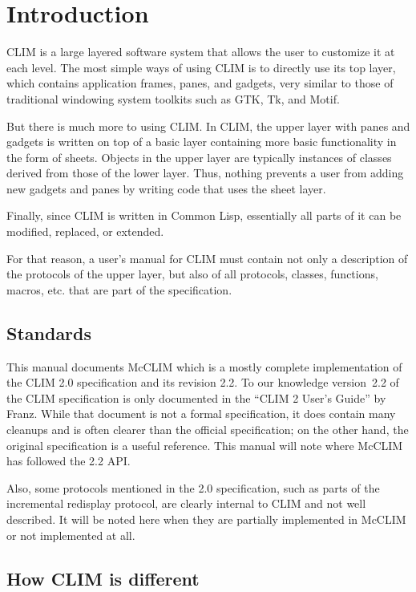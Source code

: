 \chapter{Introduction}
%

CLIM is a large layered software system that allows the user to
customize it at each level.  The most simple ways of using CLIM is to
directly use its top layer, which contains application frames, panes,
and gadgets, very similar to those of traditional windowing system
toolkits such as GTK, Tk, and Motif.

But there is much more to using CLIM.  In CLIM, the upper layer with
panes and gadgets is written on top of a basic layer containing more
basic functionality in the form of sheets.  Objects in the upper layer
are typically instances of classes derived from those of the lower
layer.  Thus, nothing prevents a user from adding new gadgets and panes
by writing code that uses the sheet layer.

Finally, since CLIM is written in Common Lisp, essentially all parts of
it can be modified, replaced, or extended.

For that reason, a user's manual for CLIM must contain not only a
description of the protocols of the upper layer, but also of all
protocols, classes, functions, macros, etc. that are part of the
specification.

\section{Standards}

This manual documents McCLIM which is a mostly
complete implementation of the CLIM 2.0 specification and its revision
2.2. To our knowledge version~2.2 of the CLIM specification is only
documented in the ``CLIM 2 User's Guide'' by Franz. While that document
is not a formal specification, it does contain many cleanups and is
often clearer than the official specification; on the other hand, the
original specification is a useful reference. This manual will note
where McCLIM has followed the 2.2 API.

Also, some protocols mentioned in the 2.0 specification, such as parts
of the incremental redisplay protocol, are clearly internal to CLIM and
not well described.  It will be noted here when they are partially
implemented in McCLIM or not implemented at all.

\section{How CLIM is different}

